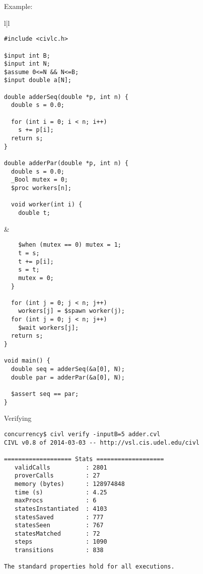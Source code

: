 \documentclass[t]{beamer}
\begin{document}
\begin{frame}[containsverbatim]{Example: }

  \begin{tabular}[t]{l|l}
    \begin{minipage}[t]{.45\textwidth}\scriptsize
\begin{verbatim}
#include <civlc.h>

$input int B;
$input int N;
$assume 0<=N && N<=B;
$input double a[N];

double adderSeq(double *p, int n) {
  double s = 0.0;
  
  for (int i = 0; i < n; i++)
    s += p[i]; 
  return s;
}

double adderPar(double *p, int n) {
  double s = 0.0;
  _Bool mutex = 0;
  $proc workers[n];

  void worker(int i) {
    double t;
\end{verbatim}
    \end{minipage}
    &
    \begin{minipage}[t]{.45\textwidth}\scriptsize
\begin{verbatim}
    $when (mutex == 0) mutex = 1;
    t = s;
    t += p[i];
    s = t;
    mutex = 0;
  }
  
  for (int j = 0; j < n; j++)
    workers[j] = $spawn worker(j);
  for (int j = 0; j < n; j++)
    $wait workers[j];
  return s;
}

void main() {
  double seq = adderSeq(&a[0], N);
  double par = adderPar(&a[0], N);

  $assert seq == par;
}
\end{verbatim}
    \end{minipage}
  \end{tabular}
\end{frame}

\begin{frame}[containsverbatim]{Verifying }

  \begin{small}
\begin{verbatim}
concurrency$ civl verify -inputB=5 adder.cvl
CIVL v0.8 of 2014-03-03 -- http://vsl.cis.udel.edu/civl

=================== Stats ===================
   validCalls          : 2801
   proverCalls         : 27
   memory (bytes)      : 128974848
   time (s)            : 4.25
   maxProcs            : 6
   statesInstantiated  : 4103
   statesSaved         : 777
   statesSeen          : 767
   statesMatched       : 72
   steps               : 1090
   transitions         : 838

The standard properties hold for all executions.
\end{verbatim}
  \end{small}
\end{frame}
\end{document}
